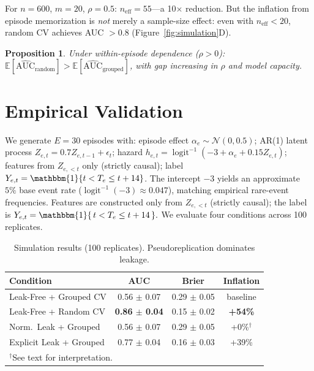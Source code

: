 \documentclass[acmsmall,nonacm]{acmart}
\newcommand{\1}{\mathbbm{1}}
\newcommand{\sigmoid}{\operatorname{logit}^{-1}}
\newcommand{\E}{\mathbb{E}}
\newtheorem{proposition}{Proposition}
\begin{document}
For $n=600$, $m=20$, $\rho=0.5$: $n_{\text{eff}} = 55$---a 10$\times$ reduction. But the inflation from episode memorization is \textit{not} merely a sample-size effect: even with $n_{\text{eff}} < 20$, random CV achieves AUC $> 0.8$ (Figure~\ref{fig:simulation}D).

\begin{proposition}
Under within-episode dependence ($\rho > 0$): $\E[\widehat{\text{AUC}}_{\text{random}}] > \E[\widehat{\text{AUC}}_{\text{grouped}}]$, with gap increasing in $\rho$ and model capacity.
\end{proposition}

\section{Empirical Validation}\label{sec:empirical}
We generate $E=30$ episodes with: episode effect $\alpha_e \sim \mathcal{N}(0,0.5)$; AR(1) latent process $Z_{e,t} = 0.7 Z_{e,t-1} + \epsilon_t$; hazard $h_{e,t} = \sigmoid(-3 + \alpha_e + 0.15 Z_{e,t})$; features from $Z_{e,<t}$ only (strictly causal); label $Y_{e,t} = \1\{t < T_e \leq t+14\}$.
The intercept $-3$ yields an approximate $5\%$ base event rate
($\operatorname{logit}^{-1}(-3)\approx 0.047$), matching empirical rare-event
frequencies. Features are constructed only from $Z_{e,<t}$ (strictly causal);
the label is $Y_{e,t}=\mathbbm{1}\{\, t < T_e \le t+14 \,\}.$
We evaluate four conditions across 100 replicates.

\begin{table}[t]
\centering
\caption{Simulation results (100 replicates). Pseudoreplication dominates leakage.}\label{tab:sim}
\vspace{-2mm}
\begin{tabular}{@{}lccc@{}}
\toprule
Condition & AUC & Brier & Inflation \\
\midrule
Leak-Free + Grouped CV & 0.56 $\pm$ 0.07 & 0.29 $\pm$ 0.05 & baseline \\
Leak-Free + Random CV & \textbf{0.86 $\pm$ 0.04} & 0.15 $\pm$ 0.02 & \textbf{+54\%} \\
Norm.\ Leak + Grouped & 0.56 $\pm$ 0.07 & 0.29 $\pm$ 0.05 & +0\%$^\dagger$ \\
Explicit Leak + Grouped & 0.77 $\pm$ 0.04 & 0.16 $\pm$ 0.03 & +39\% \\
\bottomrule
\multicolumn{4}{l}{\footnotesize $^\dagger$See text for interpretation.}
\end{tabular}
\vspace{-5mm}
\end{table}
\end{document}
